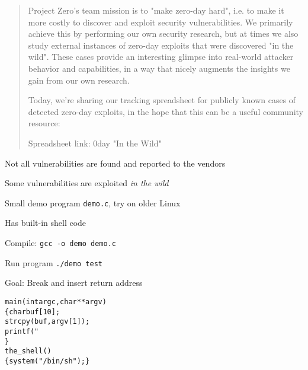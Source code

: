 \documentclass[Screen16to9,17pt]{foils}
\begin{document}
\begin{quote}

  Project Zero's team mission is to "make zero-day hard", i.e. to make it more costly to discover and exploit security vulnerabilities. We primarily achieve this by performing our own security research, but at times we also study external instances of zero-day exploits that were discovered "in the wild". These cases provide an interesting glimpse into real-world attacker behavior and capabilities, in a way that nicely augments the insights we gain from our own research.

  Today, we're sharing our tracking spreadsheet for publicly known cases of detected zero-day exploits, in the hope that this can be a useful community resource:

  Spreadsheet link: 0day "In the Wild"\\
\end{quote}

\begin{list2}
\item Not all vulnerabilities are found and reported to the vendors
\item Some vulnerabilities are exploited \emph{in the wild}
\end{list2}



\begin{list2}
\item Small demo program \verb+demo.c+, try on older Linux
\item Has built-in shell code
\item Compile:
\verb+gcc -o demo demo.c+
\item Run program
\verb+./demo test+
\item Goal: Break and insert return address
\end{list2}

\begin{alltt}\small
main(int argc, char **argv)
\{      char buf[10];
        strcpy(buf, argv[1]);
        printf("%s\textbackslash{}n",buf);
\}
the_shell()
\{  system("/bin/sh");  \}
\end{alltt}


\end{document}
